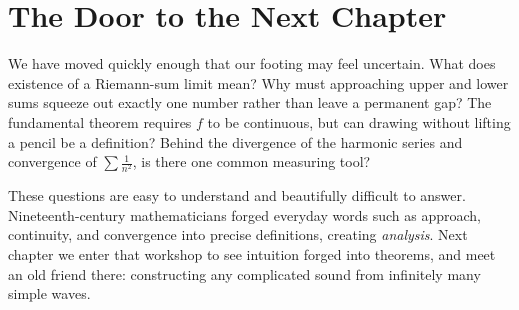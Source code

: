\section*{The Door to the Next Chapter}

We have moved quickly enough that our footing may feel uncertain. What does existence of a Riemann-sum limit mean? Why must approaching upper and lower sums squeeze out exactly one number rather than leave a permanent gap? The fundamental theorem requires $f$ to be continuous, but can drawing without lifting a pencil be a definition? Behind the divergence of the harmonic series and convergence of $\sum\frac{1}{n^{2}}$, is there one common measuring tool?

These questions are easy to understand and beautifully difficult to answer. Nineteenth-century mathematicians forged everyday words such as approach, continuity, and convergence into precise definitions, creating \emph{analysis}. Next chapter we enter that workshop to see intuition forged into theorems, and meet an old friend there: constructing any complicated sound from infinitely many simple waves.
